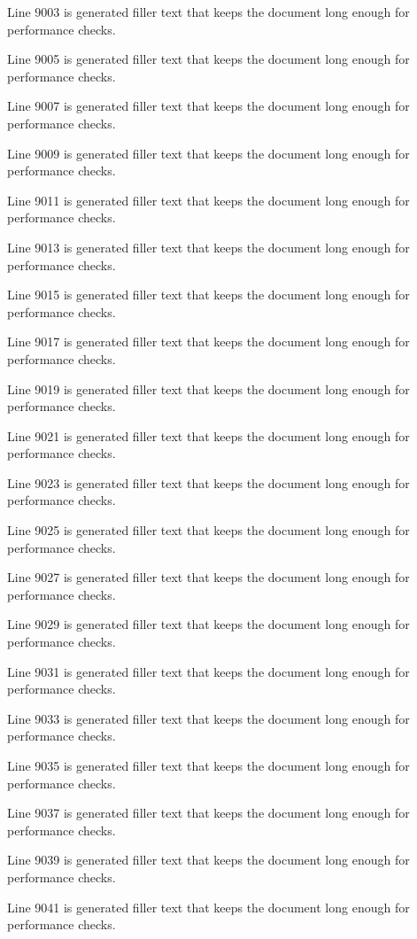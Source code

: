 Line 9003 is generated filler text that keeps the document long enough for performance checks.

Line 9005 is generated filler text that keeps the document long enough for performance checks.

Line 9007 is generated filler text that keeps the document long enough for performance checks.

Line 9009 is generated filler text that keeps the document long enough for performance checks.

Line 9011 is generated filler text that keeps the document long enough for performance checks.

Line 9013 is generated filler text that keeps the document long enough for performance checks.

Line 9015 is generated filler text that keeps the document long enough for performance checks.

Line 9017 is generated filler text that keeps the document long enough for performance checks.

Line 9019 is generated filler text that keeps the document long enough for performance checks.

Line 9021 is generated filler text that keeps the document long enough for performance checks.

Line 9023 is generated filler text that keeps the document long enough for performance checks.

Line 9025 is generated filler text that keeps the document long enough for performance checks.

Line 9027 is generated filler text that keeps the document long enough for performance checks.

Line 9029 is generated filler text that keeps the document long enough for performance checks.

Line 9031 is generated filler text that keeps the document long enough for performance checks.

Line 9033 is generated filler text that keeps the document long enough for performance checks.

Line 9035 is generated filler text that keeps the document long enough for performance checks.

Line 9037 is generated filler text that keeps the document long enough for performance checks.

Line 9039 is generated filler text that keeps the document long enough for performance checks.

Line 9041 is generated filler text that keeps the document long enough for performance checks.

